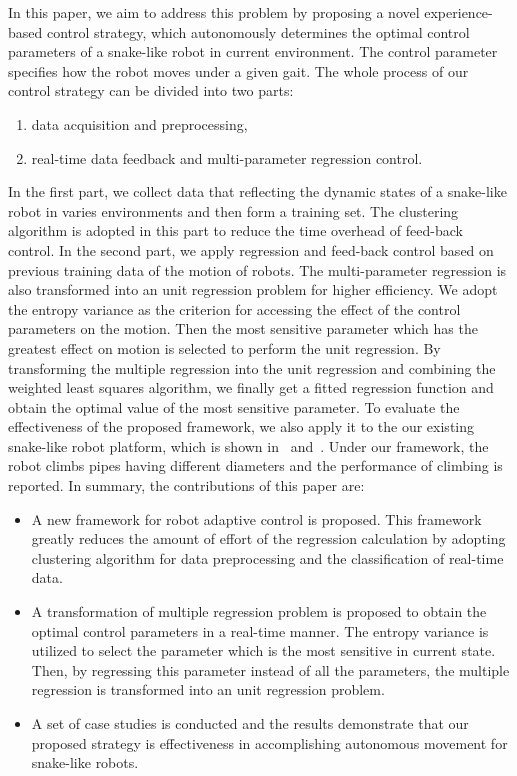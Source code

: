 In this paper, we aim to address this problem by proposing a novel experience-based control strategy,
which autonomously determines the optimal control parameters of a snake-like robot in
current environment. The control parameter specifies how the robot moves under a given
gait. The whole process of our control strategy can be divided into two parts:
\begin{enumerate}
	\item data acquisition and preprocessing,
	\item real-time data feedback and multi-parameter regression control.
\end{enumerate}
In the first part, we collect data that reflecting the dynamic states of a snake-like
robot in varies environments and then form a training set. The clustering
algorithm\cite{Cluseter_ICT}\cite{KmeansAndDeepLearning}
is adopted in this part to reduce the time overhead of feed-back control.
In the second part, we apply regression and feed-back control based on previous
training data of the motion of robots. The multi-parameter regression
is also transformed into an unit regression problem for higher efficiency.
We adopt the entropy
variance\cite{WaveformEntropyVariance}\cite{EntropyandVarianceasRiskMeasure}\cite{UsingEntropyAndVariance}
as the criterion for accessing the effect of the control parameters on the motion.
Then the most sensitive parameter which has the greatest effect on motion is selected
to perform the unit regression. By transforming the multiple regression into the 
unit regression and combining the weighted least squares algorithm\cite{gradientMethod}\cite{MSEestimates}, 
we finally get a fitted regression function and obtain the optimal value of the most sensitive parameter.
To evaluate the effectiveness of the proposed framework, we also apply it to the our 
existing snake-like robot platform, which is shown in~
and~. 
Under our framework, the robot climbs pipes having different diameters and the
performance of climbing is reported. In summary, the contributions of this paper are:
\begin{itemize}
	\item A new framework for robot adaptive control is proposed.
 	      This framework greatly reduces the amount of  effort of the regression calculation 
           by adopting clustering algorithm for data preprocessing and the classification of 
           real-time data.
	\item A transformation of multiple regression problem is proposed to obtain the optimal
          control parameters in a real-time manner.
         The entropy variance is utilized to select the parameter which is the most sensitive 
         in current state. Then, by regressing this parameter instead of all the parameters, the 
         multiple regression is transformed into an unit regression problem.
    \item A set of case studies is conducted and the results demonstrate
    that our proposed strategy is effectiveness in accomplishing autonomous movement for snake-like robots.
\end{itemize}
